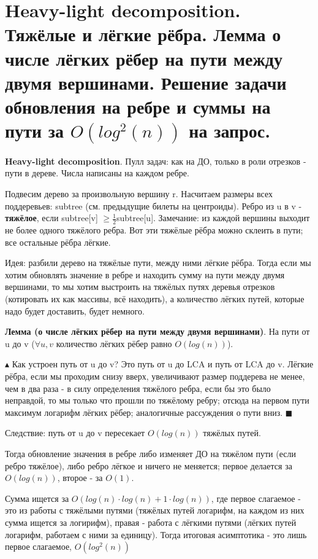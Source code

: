 \setcounter{section}{99}
\section{Heavy-light decomposition. Тяжёлые и лёгкие рёбра. Лемма о числе лёгких рёбер на пути между двумя вершинами. Решение задачи обновления на ребре и суммы на пути за $O(log^2(n))$ на запрос.}

\textbf{Heavy-light decomposition}. Пулл задач: как на ДО, только в роли отрезков - пути в дереве. Числа написаны на каждом ребре.

Подвесим дерево за произвольную вершину r. Насчитаем размеры всех поддеревьев: subtree (см. предыдущие билеты на центроиды). Ребро из u в v - \textbf{тяжёлое}, если subtree[v] $\geqslant \frac{1}{2}$subtree[u]. Замечание: из каждой вершины выходит не более одного тяжёлого ребра. Вот эти тяжёлые рёбра можно склеить в пути; все остальные рёбра лёгкие.

Идея: разбили дерево на тяжёлые пути, между ними лёгкие рёбра. Тогда если мы хотим обновлять значение в ребре и находить сумму на пути между двумя вершинами, то мы хотим выстроить на тяжёлых путях деревья отрезков (котировать их как массивы, всё находить), а количество лёгких путей, которые надо будет доставить, будет немного.

\textbf{Лемма (о числе лёгких рёбер на пути между двумя вершинами)}. На пути от u до v ($\forall u, v$ количество лёгких рёбер равно $O(log(n))$).

$\blacktriangle$
Как устроен путь от u до v? Это путь от u до LCA и путь от LCA до v. Лёгкие рёбра, если мы проходим снизу вверх, увеличивают размер поддерева не менее, чем в два раза - в силу определения тяжёлого ребра, если бы это было неправдой, то мы только что прошли по тяжёлому ребру; отсюда на первом пути максимум логарифм лёгких рёбер; аналогичные рассуждения о пути вниз.
$\blacksquare$

Следствие: путь от u до v пересекает $O(log(n))$ тяжёлых путей.

Тогда обновление значения в ребре либо изменяет ДО на тяжёлом пути (если ребро тяжёлое), либо ребро лёгкое и ничего не меняется; первое делается за $O(log(n))$, второе - за $O(1)$.

Сумма ищется за $O(log(n)\cdot log(n) + 1\cdot log(n))$, где первое слагаемое - это из работы с тяжёлыми путями (тяжёлых путей логарифм, на каждом из них сумма ищется за логирифм), правая - работа с лёгкими путями (лёгких путей логарифм, работаем с ними за единицу). Тогда итоговая асимптотика - это лишь первое слагаемое, $O(log^2(n))$

